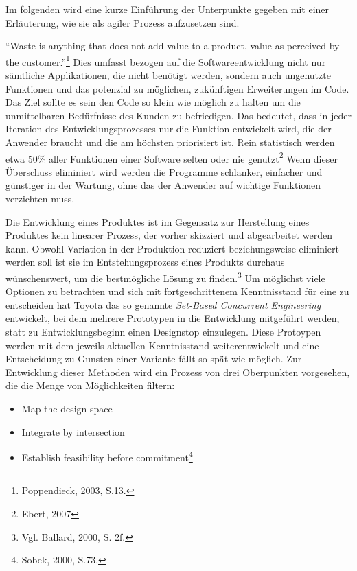                 Im folgenden wird eine kurze Einführung der Unterpunkte gegeben mit einer Erläuterung, wie sie als agiler Prozess aufzusetzen sind.

                \enquote{Waste is anything that does not add value to a product, value as perceived by the customer.}\footnote{Poppendieck, 2003, S.13.} Dies umfasst bezogen auf die Softwareentwicklung nicht nur sämtliche Applikationen, die nicht benötigt werden, sondern auch ungenutzte Funktionen und das potenzial zu möglichen, zukünftigen Erweiterungen im Code. Das Ziel sollte es sein den Code so klein wie möglich zu halten um die unmittelbaren Bedürfnisse des Kunden zu befriedigen. Das bedeutet, dass in jeder Iteration des Entwicklungsprozesses nur die Funktion entwickelt wird, die der Anwender braucht und die am höchsten priorisiert ist. Rein statistisch werden etwa 50\% aller Funktionen einer Software selten oder nie genutzt\footnote{Ebert, 2007} Wenn dieser Überschuss eliminiert wird werden die Programme schlanker, einfacher und günstiger in der Wartung, ohne das der Anwender auf wichtige Funktionen verzichten muss.

                Die Entwicklung eines Produktes ist im Gegensatz zur Herstellung eines Produktes kein linearer Prozess, der vorher skizziert und abgearbeitet werden kann. Obwohl Variation in der Produktion reduziert beziehungsweise eliminiert werden soll ist sie im Entstehungsprozess eines Produkts durchaus wünschenswert, um die bestmögliche Lösung zu finden.\footnote{Vgl. Ballard, 2000, S. 2f.} Um möglichst viele Optionen zu betrachten und sich mit fortgeschrittenem Kenntnisstand für eine zu entscheiden hat Toyota das so genannte \emph{Set-Based Concurrent Engineering} entwickelt, bei dem mehrere Prototypen in die Entwicklung mitgeführt werden, statt zu Entwicklungsbeginn einen Designstop einzulegen. Diese Protoypen werden mit dem jeweils aktuellen Kenntnisstand weiterentwickelt und eine Entscheidung zu Gunsten einer Variante fällt so spät wie möglich. Zur Entwicklung dieser Methoden wird ein Prozess von drei Oberpunkten vorgesehen, die die Menge von Möglichkeiten filtern:

                \begin{itemize}
                  \item Map the design space
                  \item Integrate by intersection
                  \item Establish feasibility before commitment\footnote{Sobek, 2000, S.73.}
                \end{itemize}

